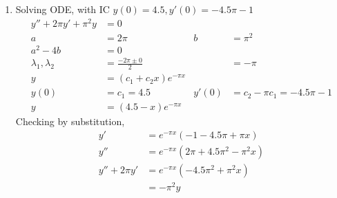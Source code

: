 \begin{enumerate}
    \item Solving ODE, with IC $ y(0) = 4.5, y'(0) = -4.5\pi - 1 $
          \begin{align}
              y'' + 2\pi y' + \pi ^{2}y & = 0                                                                     \\
              a                         & = 2\pi                      & b     & = \pi ^{2}                        \\
              a^{2} - 4b                & = 0                                                                     \\
              \lambda_{1}, \lambda_{2}  & = \frac{-2\pi \pm 0}{2}     &       & = -\pi                            \\
              y                         & = (c_{1}+ c_{2}x)e^{-\pi x}                                             \\
              y(0)                      & = c_{1} = 4.5               & y'(0) & = c_{2} - \pi c_{1} = -4.5\pi - 1 \\
              y                         & =(4.5 - x)e^{-\pi x}
          \end{align}
          Checking by substitution,
          \begin{align}
              y'           & = e^{-\pi x}(-1 - 4.5\pi + \pi x)            \\
              y''          & = e^{-\pi x}(2\pi + 4.5\pi ^{2} - \pi ^{2}x) \\
              y''+ 2\pi y' & = e^{-\pi x}(-4.5 \pi ^{2} + \pi ^{2}x)      \\
                           & = -\pi ^{2}y
          \end{align}


\end{enumerate}
